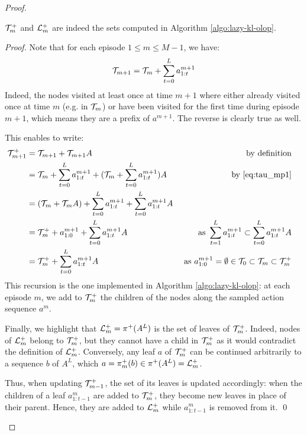 \documentclass[runningheads]{llncs}
\begin{document}
\begin{proof}
\begin{lemma}
$\mathcal{T}_m^+$ and $\mathcal{L}_m^+$ are indeed the sets computed in Algorithm  \ref{algo:lazy-kl-olop}.
\end{lemma}
\begin{proof}
Note that for each episode $1 \leq m \leq M - 1$, we have:
\begin{equation}
\label{eq:tau_mp1}
    \mathcal{T}_{m+1} = \mathcal{T}_{m} + \sum_{t=0}^L a^{m+1}_{1:t}
\end{equation}
Indeed, the nodes visited at least once at time $m+1$ where either already visited once at time $m$ (e.g. in $\mathcal{T}_{m}$) or have been visited for the first time during episode $m+1$, which means they are a prefix of $a^{m+1}$. The reverse is clearly true as well.

This enables to write:
\begin{align*}
    \mathcal{T}_{m+1}^+ &= \mathcal{T}_{m+1} + \mathcal{T}_{m+1}A & \text{by definition}\\
    &= \mathcal{T}_{m} + \sum_{t=0}^L a^{m+1}_{1:t} + (\mathcal{T}_{m} + \sum_{t=0}^L a^{m+1}_{1:t})A & \text{by \eqref{eq:tau_mp1}} & \\
    &= (\mathcal{T}_{m} + \mathcal{T}_{m}A) + \sum_{t=0}^L a^{m+1}_{1:t} + \sum_{t=0}^L a^{m+1}_{1:t}A & \\
    &= \mathcal{T}_{m}^+ + a^{m+1}_{1:0} + \sum_{t=0}^L a^{m+1}_{1:t}A &\text{ as } \sum_{t=1}^L a^{m+1}_{1:t} \subset \sum_{t=0}^L a^{m+1}_{1:t}A\\
    &=  \mathcal{T}_{m}^+ + \sum_{t=0}^L a^{m+1}_{1:t}A  &\text{ as }a^{m+1}_{1:0}=\emptyset \in \mathcal{T}_{0} \subset \mathcal{T}_{m} \subset \mathcal{T}_m^+
\end{align*}
This recursion is the one implemented in Algorithm \ref{algo:lazy-kl-olop}: at each episode $m$, we add to $\mathcal{T}_{m}^+$ the children of the nodes along the sampled action sequence $a^{m}$.

Finally, we highlight that $\mathcal{L}_m^+ = \pi^+(A^L)$ is the set of leaves of $\mathcal{T}_{m}^+$.
Indeed, nodes of $\mathcal{L}_m^+$ belong to $\mathcal{T}_{m}^+$, but they cannot have a child in $\mathcal{T}_{m}^+$ as it would contradict the definition of $\mathcal{L}_m^+$. Conversely, any leaf $a$ of $\mathcal{T}_{m}^+$ can be continued arbitrarily to a sequence $b$ of $A^L$, which  $a = \pi_m^+(b) \in \pi^+(A^L) = \mathcal{L}_m^+$.

Thus, when updating $\mathcal{T}_{m-1}^+$, the set of its leaves is updated accordingly: when the children of a leaf $a^m_{1:t-1}$ are added to $\mathcal{T}_m^+$, they become new leaves in place of their parent. Hence, they are added to $\mathcal{L}_m^+$ while $a^m_{1:t-1}$ is removed from it.
\qed
\end{proof}


\end{proof}
\end{document}
